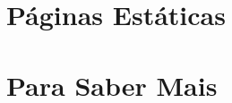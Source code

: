 \documentclass[t, 				             
			   final,
			   12pt, 				         
			   xcolor={usenames,dvipsnames}, 
			   table]{beamer}
\begin{document}
	
	
	  	

  	\section{Páginas Estáticas}
		
		
		

  	\section{Para Saber Mais}
		
\end{document}
